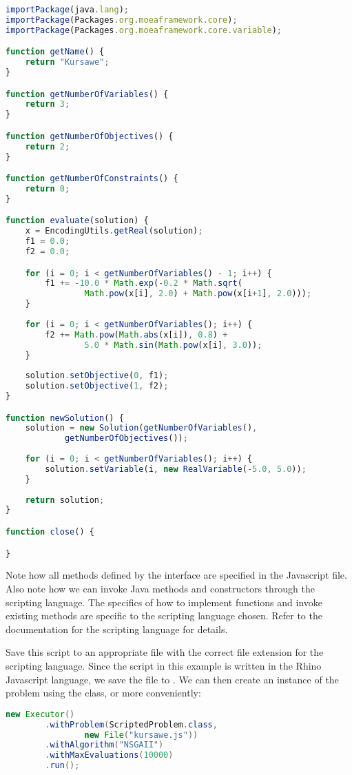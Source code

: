 \begin{lstlisting}[language=JavaScript]
importPackage(java.lang);
importPackage(Packages.org.moeaframework.core);
importPackage(Packages.org.moeaframework.core.variable);

function getName() {
	return "Kursawe";
}

function getNumberOfVariables() {
	return 3;
}

function getNumberOfObjectives() {
	return 2;
}

function getNumberOfConstraints() {
	return 0;
}

function evaluate(solution) {
	x = EncodingUtils.getReal(solution);
	f1 = 0.0;
	f2 = 0.0;

	for (i = 0; i < getNumberOfVariables() - 1; i++) {
		f1 += -10.0 * Math.exp(-0.2 * Math.sqrt(
				Math.pow(x[i], 2.0) + Math.pow(x[i+1], 2.0)));
	}
 
	for (i = 0; i < getNumberOfVariables(); i++) {
		f2 += Math.pow(Math.abs(x[i]), 0.8) +  
				5.0 * Math.sin(Math.pow(x[i], 3.0));
	}
 
	solution.setObjective(0, f1);
	solution.setObjective(1, f2);
}

function newSolution() {
	solution = new Solution(getNumberOfVariables(), 
			getNumberOfObjectives());
 
	for (i = 0; i < getNumberOfVariables(); i++) {
		solution.setVariable(i, new RealVariable(-5.0, 5.0));
	}
 
	return solution;
}

function close() {

}
\end{lstlisting}

Note how all methods defined by the  interface are specified in the Javascript file.  Also note how we can invoke Java methods and constructors through the scripting language.  The specifics of how to implement functions and invoke existing methods are specific to the scripting language chosen.  Refer to the documentation for the scripting language for details.

Save this script to an appropriate file with the correct file extension for the scripting language.  Since the script in this example is written in the Rhino Javascript language, we save the file to .  We can then create an instance of the problem using the  class, or more conveniently:

\begin{lstlisting}[language=Java]
new Executor()
		.withProblem(ScriptedProblem.class, 
				new File("kursawe.js"))
		.withAlgorithm("NSGAII")
		.withMaxEvaluations(10000)
		.run();
\end{lstlisting}

